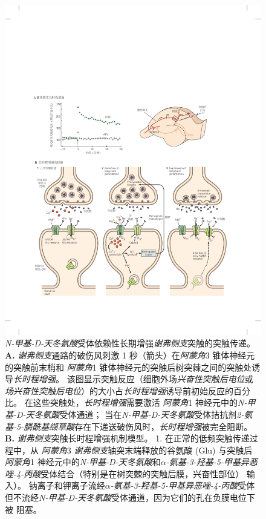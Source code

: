 \begin{figure}[htbp]
	\centering
	\includegraphics[width=0.9\linewidth]{chap13/fig_13_10}
	\caption{\textit{N-甲基-D-天冬氨酸}受体依赖性长期增强\textit{谢弗侧支}突触的突触传递。
		\textbf{A.} \textit{谢弗侧支}通路的破伤风刺激 1 秒（箭头）在\textit{阿蒙角}3 锥体神经元的突触前末梢和 \textit{阿蒙角}1 锥体神经元的突触后树突棘之间的突触处诱导\textit{长时程增强}。
		该图显示突触反应（细胞外场\textit{兴奋性突触后电位}或\textit{场兴奋性突触后电位}）的大小占\textit{长时程增强}诱导前初始反应的百分比。
		在这些突触处，\textit{长时程增强}需要激活 \textit{阿蒙角}1 神经元中的\textit{N-甲基-D-天冬氨酸}受体通道； 
		当在\textit{N-甲基-D-天冬氨酸}受体拮抗剂\textit{2-氨基-5-膦酰基缬草酸}存在下递送破伤风时，\textit{长时程增强}被完全阻断\cite{morgan2001electrical}。
		\textbf{B.} \textit{谢弗侧支}突触长时程增强机制模型。
		1. 在正常的低频突触传递过程中，从 \textit{阿蒙角}3 \textit{谢弗侧支}轴突末端释放的谷氨酸 (Glu) 与突触后 \textit{阿蒙角}1 神经元中的\textit{N-甲基-D-天冬氨酸}和\textit{$\alpha$-氨基-3-羟基-5-甲基异恶唑-4-丙酸}受体结合（特别是在树突棘的突触后膜，兴奋性部位） 输入）。
		钠离子和钾离子流经\textit{$\alpha$-氨基-3-羟基-5-甲基异恶唑-4-丙酸}受体但不流经\textit{N-甲基-D-天冬氨酸}受体通道，因为它们的孔在负膜电位下被  阻塞。
}
\end{figure}
